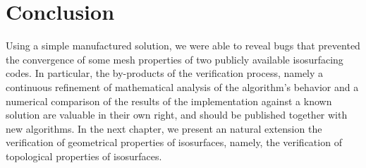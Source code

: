 \section{Conclusion}

Using a simple manufactured solution, 
we were able to reveal bugs that prevented the convergence of 
some mesh properties of two publicly available isosurfacing codes.
In particular, the by-products of the verification process, namely
a continuous refinement of mathematical analysis of the algorithm's
behavior and a numerical comparison of the results of the 
implementation against a known solution are valuable in their own right, 
and should be published together with new algorithms.
%
In the next chapter, we present an natural extension the verification of geometrical properties of isosurfaces, namely, the verification of topological properties of isosurfaces.


